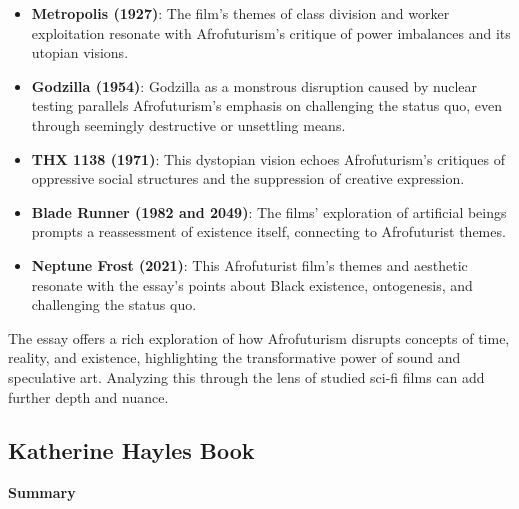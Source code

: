 \documentclass[11pt,fleqn]{book}
\begin{document}
\begin{itemize}
\item \textbf{Metropolis (1927)}:  The film's themes of class division and worker exploitation resonate with Afrofuturism's critique of power imbalances and its utopian visions. 

\item \textbf{Godzilla (1954)}:  Godzilla as a monstrous disruption caused by nuclear testing parallels Afrofuturism's emphasis on challenging the status quo, even through seemingly destructive or unsettling means.

\item \textbf{THX 1138 (1971)}: This dystopian vision echoes Afrofuturism's critiques of oppressive social structures and the suppression of creative expression.

\item \textbf{Blade Runner (1982 and 2049)}: The films' exploration of artificial beings prompts a reassessment of existence itself, connecting to Afrofuturist themes.

\item \textbf{Neptune Frost (2021)}: This Afrofuturist film's themes and aesthetic resonate with the essay's points about Black existence, ontogenesis, and challenging the status quo.
\end{itemize}

\vspace{5pt}

The essay offers a rich exploration of how Afrofuturism disrupts concepts of time, reality, and existence, highlighting the transformative power of sound and speculative art. Analyzing this through the lens of studied sci-fi films can add further depth and nuance. 




\subsection{Katherine Hayles Book}
\textbf{Summary}
\end{document}
